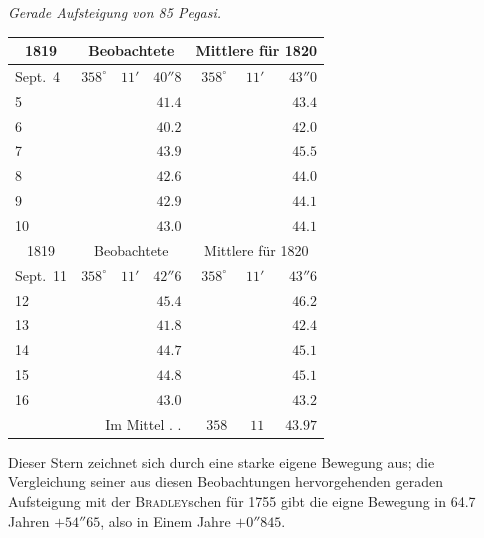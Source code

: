 \begin{center}
\emph{Gerade Aufsteigung von 85 Pegasi.}
\end{center}

\begin{center}
\begin{tabular}{l|rrr|rrr}
\multicolumn{1}{c|}{1819}  &  \multicolumn{3}{c|}{Beobachtete}  &  \multicolumn{3}{c}{Mittlere für 1820}  \\
\hline
Sept.\ 4  &  $358^\circ$  &  $11'$  &  $40''8$  &  $358^\circ$  &  $11'$  &  $43''0$  \\
5  &   &   &  $41.4$  &   &   &  $43.4$  \\
6  &   &   &  $40.2$  &   &   &  $42.0$  \\
7  &   &   &  $43.9$  &   &   &  $45.5$  \\
8  &   &   &  $42.6$  &   &   &  $44.0$  \\
9  &   &   &  $42.9$  &   &   &  $44.1$  \\
10  &   &   &  $43.0$  &   &   &  $44.1$  \\
\hline
 \multicolumn{1}{c|}{1819}  &  \multicolumn{3}{c|}{Beobachtete}  &  \multicolumn{3}{c}{Mittlere für 1820}  \\
\hline
 Sept.\ 11  &  $358^\circ$  &  $11'$  &  $42''6$  &  $358^\circ$  &  $11'$  &  $43''6$  \\
 12  &   &   &  $45.4$  &   &   &  $46.2$  \\
 13  &   &   &  $41.8$  &   &   &  $42.4$  \\
 14  &   &   &  $44.7$  &   &   &  $45.1$  \\
 15  &   &   &  $44.8$  &   &   &  $45.1$  \\
 16  &   &   &  $43.0$  &   &   &  $43.2$  \\
\multicolumn{4}{r|}{Im Mittel . .} &  $358$  &  $11$  &  $43.97$  \\
\end{tabular}
\end{center}

\par\indent Dieser Stern zeichnet sich durch eine starke eigene Bewegung aus; die Vergleichung seiner aus diesen Beobachtungen hervorgehenden geraden Aufsteigung mit der \textsc{Bradley}schen für 1755 gibt die eigne Bewegung in 64.7 Jahren $+54''65$, also in Einem Jahre $+0''845$.
